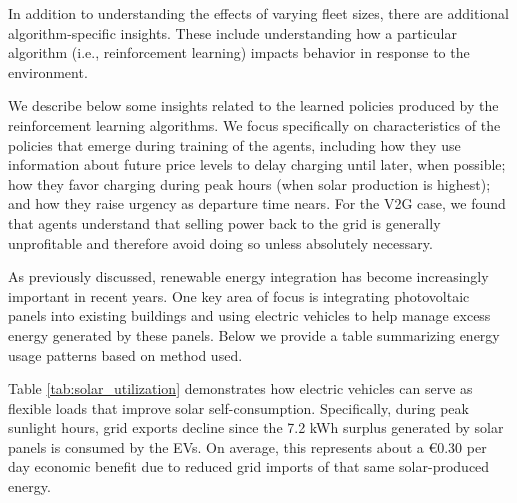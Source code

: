 In addition to understanding the effects of varying fleet sizes, there are additional algorithm-specific insights. These include understanding how a particular algorithm (i.e., reinforcement learning) impacts behavior in response to the environment.

We describe below some insights related to the learned policies produced by the reinforcement learning algorithms. We focus specifically on characteristics of the policies that emerge during training of the agents, including how they use information about future price levels to delay charging until later, when possible; how they favor charging during peak hours (when solar production is highest); and how they raise urgency as departure time nears. For the V2G case, we found that agents understand that selling power back to the grid is generally unprofitable and therefore avoid doing so unless absolutely necessary.

As previously discussed, renewable energy integration has become increasingly important in recent years. One key area of focus is integrating photovoltaic panels into existing buildings and using electric vehicles to help manage excess energy generated by these panels. Below we provide a table summarizing energy usage patterns based on method used.

\begin{table}[H]
\centering
\caption{Solar energy utilization breakdown}
\label{tab:solar_utilization}
\end{table}

Table \ref{tab:solar_utilization} demonstrates how electric vehicles can serve as flexible loads that improve solar self-consumption. Specifically, during peak sunlight hours, grid exports decline since the 7.2 kWh surplus generated by solar panels is consumed by the EVs. On average, this represents about a €0.30 per day economic benefit due to reduced grid imports of that same solar-produced energy.

